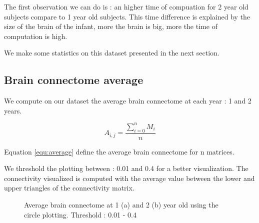 \documentclass[]{spie}  %
\begin{document}
The first observation we can do is : an higher time of compuation for 2 year old subjects compare to 1 year old subjects. This time difference is explained by the size of the brain of the infant, more the brain is big, more the time of computation is high.

We make some statistics on this dataset presented in the next section.

\subsection{Brain connectome average}

We compute on our dataset the average brain connectome at each year : 1 and 2 years. 

\begin{equation}
	A_{i,j} = \frac{\sum_{i=0}^n M_i}{n}
	\label{equ:average}
\end{equation}

Equation \ref{equ:average} define the average brain connectome for n matrices. 

We threshold the plotting between : 0.01 and 0.4 for a better visualization.
The connectivity visualized is computed with the average value between the lower and upper triangles of the connectivity matrix.

\begin{figure}
\centering 
{}
\caption[Average brain connectome at 1 (a) and 2 (b) year old using the circle plotting ]{Average brain connectome at 1 (a) and 2 (b) year old using the circle plotting. Threshold : 0.01 - 0.4}
\label{fig:AverageBrainConnectome}
\end{figure} 
\end{document}
